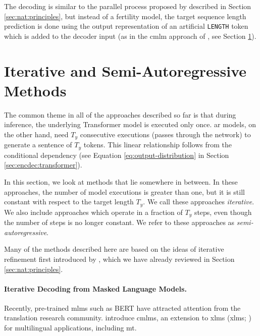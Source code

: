 The decoding is similar to the parallel process proposed by
\citet{gu2017nonautoregressive} described in Section \ref{sec:nat:principles},
but instead of a fertility model, the target sequence length prediction is done
using the output representation of an artificial \texttt{LENGTH} token which is
added to the decoder input (as in the \ac{cmlm} approach of
\citealp{ghazvininejad-etal-2019-mask}, see Section \ref{sec:nat:semi}).



\section{Iterative and Semi-Autoregressive Methods}%
\label{sec:nat:semi}

The common theme in all of the approaches described so far is that during
inference, the underlying Transformer model is executed only once.  \Acl{ar}
models, on the other hand, need $T_y$ consecutive executions (passes through
the network) to generate a sentence of $T_y$ tokens. This linear relationship
follows from the conditional dependency (see Equation
\ref{eq:output-distribution} in Section \ref{sec:encdec:transformer}).

In this section, we look at methods that lie somewhere in between. In these
approaches, the number of model executions is greater than one, but it is still
constant with respect to the target length $T_y$. We call these approaches
\emph{iterative}. We also include approaches which operate in a fraction of
$T_y$ steps, even though the number of steps is no longer constant. We refer to
these approaches as \emph{semi-autoregressive}.

Many of the methods described here are based on the ideas of iterative
refinement first introduced by \citet{lee-etal-2018-deterministic}, which we
have already reviewed in Section \ref{sec:nat:principles}.

\paragraph{Iterative Decoding from Masked Language Models.} Recently,
pre-trained \acp{mlm} such as BERT \citep{devlin-etal-2019-bert} have attracted
attention from the translation research
community. \citet{ghazvininejad-etal-2019-mask} introduce
\acfp{cmlm}, an extension to \aclp{xlm}
(\acsp{xlm}; \citealp{conneau-lample-2019-cross}) for
multilingual applications, including \ac{mt}.

